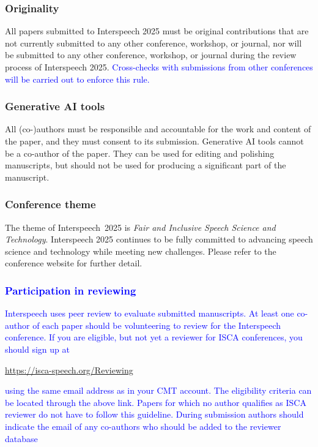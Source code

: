 \documentclass{Interspeech}
\newcommand{\blue}[1]{\textcolor{blue}{#1}}
\begin{document}
\subsubsection{Originality}

All papers submitted to Interspeech 2025 must be original contributions that are not currently submitted to any other conference, workshop, or journal, nor will be submitted to any other conference, workshop, or journal during the review process of Interspeech 2025. \blue{Cross-checks with submissions from other conferences will be carried out to enforce this rule.}

\subsubsection{Generative AI tools}

All (co-)authors must be responsible and accountable for the work and content of the paper, and they must consent to its submission. Generative AI tools cannot be a co-author of the paper. They can be used for editing and polishing manuscripts, but should not be used for producing a significant part of the manuscript.


\subsubsection{Conference theme}

The theme of Interspeech~2025 is \textit{Fair and Inclusive Speech Science and Technology}. Interspeech 2025 continues to be fully committed to advancing speech science and technology while meeting new challenges. Please refer to the conference website for further detail.

\subsubsection{\blue{Participation in reviewing}}

\blue{Interspeech uses peer review to evaluate submitted manuscripts. At least one co-author of each paper should be volunteering to review for the Interspeech conference. If you are eligible, but not yet a reviewer for ISCA conferences, you should sign up at} 

\begin{center}
    \url{https://isca-speech.org/Reviewing} 
\end{center}
\blue{using the same email address as in your CMT account.
The eligibility criteria can be located through the above link. Papers for which no author qualifies as ISCA reviewer do not have to follow this guideline. During submission authors should indicate the email of any co-authors who should be added to the reviewer database}
\end{document}
